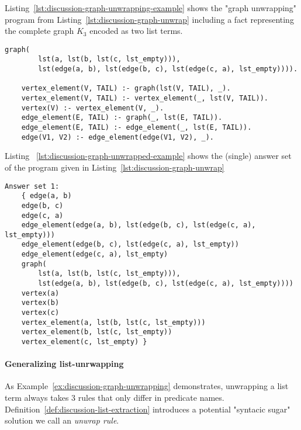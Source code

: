 \begin{example}
\label{ex:discussion-graph-unwrapping} 
Listing~\ref{lst:discussion-graph-unwrapping-example} shows the "graph unwrapping" program from Listing~\ref{lst:discussion-graph-unwrap} including a fact representing the complete graph $K_3$ encoded as two list terms.
\begin{lstlisting}[style=asp-code, label={lst:discussion-graph-unwrapping-example}, caption={Unwrapping the list representation of $K_3$.}]
	graph(
		lst(a, lst(b, lst(c, lst_empty))),
		lst(edge(a, b), lst(edge(b, c), lst(edge(c, a), lst_empty)))).
	
	vertex_element(V, TAIL) :- graph(lst(V, TAIL), _).
	vertex_element(V, TAIL) :- vertex_element(_, lst(V, TAIL)).
	vertex(V) :- vertex_element(V, _).
	edge_element(E, TAIL) :- graph(_, lst(E, TAIL)).
	edge_element(E, TAIL) :- edge_element(_, lst(E, TAIL)).
	edge(V1, V2) :- edge_element(edge(V1, V2), _).
\end{lstlisting}
Listing ~\ref{lst:discussion-graph-unwrapped-example} shows the (single) answer set of the program given in Listing~\ref{lst:discussion-graph-unwrap}
\begin{lstlisting}[style=asp-code, label={lst:discussion-graph-unwrapped-example}, caption={The unwrapped list representation of $K_3$.}]
Answer set 1:
	{ edge(a, b)
	edge(b, c)
	edge(c, a)
	edge_element(edge(a, b), lst(edge(b, c), lst(edge(c, a), lst_empty)))
	edge_element(edge(b, c), lst(edge(c, a), lst_empty))
	edge_element(edge(c, a), lst_empty)
	graph(
		lst(a, lst(b, lst(c, lst_empty))), 
		lst(edge(a, b), lst(edge(b, c), lst(edge(c, a), lst_empty))))
	vertex(a)
	vertex(b)
	vertex(c)
	vertex_element(a, lst(b, lst(c, lst_empty)))
	vertex_element(b, lst(c, lst_empty))
	vertex_element(c, lst_empty) }
\end{lstlisting}
\end{example}    

\paragraph{Generalizing list-unrwapping}
As Example~\ref{ex:discussion-graph-unwrapping} demonstrates, unwrapping a list term always takes 3 rules that only differ in predicate names. Definition~\ref{def:discussion-list-extraction} introduces a potential "syntacic sugar" solution we call an \emph{unwrap rule}.

